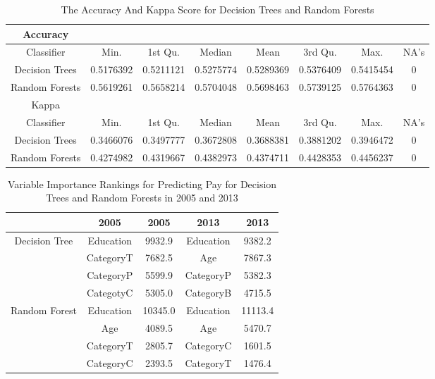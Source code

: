 \documentclass{article}
\begin{document}
    \begin{center}
        \begin{table}
            \centering
            \begin{tabular}{ |c|c|c|c|c|c|c|c| }
                \hline
                Accuracy \\
                \hline
                Classifier & Min. & 1st Qu. & Median & Mean & 3rd Qu. & Max. & NA's \\
                Decision Trees & 0.5176392 & 0.5211121 & 0.5275774 & 0.5289369 & 0.5376409 & 0.5415454 & 0 \\
                Random Forests & 0.5619261 & 0.5658214 & 0.5704048 & 0.5698463 & 0.5739125 & 0.5764363 & 0 \\
                \hline
                Kappa \\
                \hline
                Classifier & Min. & 1st Qu. & Median & Mean & 3rd Qu. & Max. & NA's \\
                Decision Trees & 0.3466076 & 0.3497777 & 0.3672808 & 0.3688381 & 0.3881202 & 0.3946472 & 0 \\
                Random Forests & 0.4274982 & 0.4319667 & 0.4382973 & 0.4374711 & 0.4428353 & 0.4456237 & 0 \\
                \hline
            \end{tabular}
            \caption{The Accuracy And Kappa Score for Decision Trees and Random Forests}
            \label{tab:7}
        \end{table}
    \end{center}

    \begin{center}
        \begin{table}
            \centering
            \begin{tabular}{ |c|c|c|c|c| }
                \hline
                & 2005 & 2005 & 2013 & 2013 \\
                \hline
                Decision Tree & Education & 9932.9 & Education & 9382.2 \\
                & CategoryT & 7682.5 & Age & 7867.3 \\
                & CategoryP & 5599.9 & CategoryP & 5382.3 \\
                & CategotyC & 5305.0 & CategoryB & 4715.5 \\
                \hline
                Random Forest & Education & 10345.0 & Education & 11113.4 \\
                & Age & 4089.5 & Age & 5470.7 \\
                & CategoryT & 2805.7 & CategoryC & 1601.5 \\
                & CategoryC & 2393.5 & CategoryT & 1476.4 \\
                \hline
            \end{tabular}
            \caption{Variable Importance Rankings for Predicting Pay for Decision Trees and Random Forests in 2005 and 2013}
            \label{tab:8}
        \end{table}
    \end{center}
\end{document}
